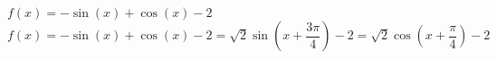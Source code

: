 {$f(x) = -\sin(x) + \cos(x) - 2$}
{$f(x) = -\sin(x) + \cos(x) - 2 = \sqrt{2}\sin\left(x + \dfrac{3\pi}{4}\right) - 2 = \sqrt{2}\cos\left(x + \dfrac{\pi}{4}\right) - 2$}
